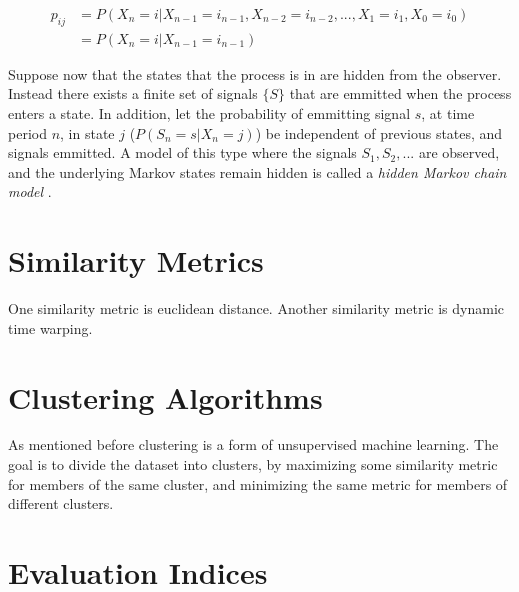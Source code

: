 \begin{equation}
    \begin{split}
        p_{ij} &= P(X_n = i | X_{n-1} = i_{n-1}, X_{n-2} = i_{n-2},..., X_{1} = i_{1}, X_{0} = i_{0}) \\
        &= P(X_n = i| X_{n-1} = i_{n-1})      
    \end{split}
    \label{eq:markov_property}
\end{equation}


Suppose now that the states that the process is in are hidden from the observer. Instead there exists a finite set of signals $\{S\}$ that are emmitted when the process enters a state. In addition, let the probability of emmitting signal $s$, at time period $n$, in state $j$ ($P(S_n = s | X_n = j)$) be independent of previous states, and signals emmitted. A model of this type where the signals $S_1, S_2, ...$ are observed, and the underlying Markov states remain hidden is called a \textit{hidden Markov chain model} \cite{stoch_pros}. 

\section{Similarity Metrics}
One similarity metric is euclidean distance.
Another similarity metric is dynamic time warping.

\section{Clustering Algorithms}
As mentioned before clustering is a form of unsupervised machine learning. The goal is to divide the dataset into clusters, by maximizing some similarity metric for members of the same cluster, and minimizing the same metric for members of different clusters.

\section{Evaluation Indices} 
